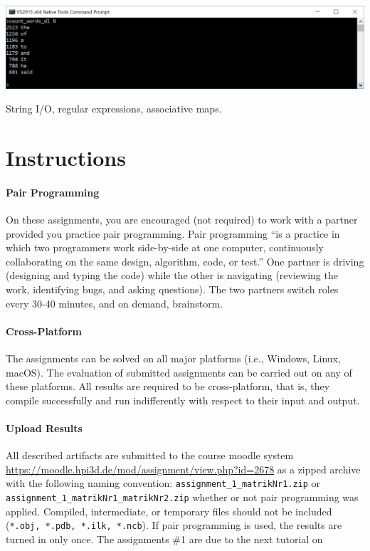 \documentclass{cgsblatt}
\let\theexercise 1
\begin{document}
\hspace{\leftmargin}\includegraphics[width=\linewidth-\leftmargin]{count_words}


String I/O, regular expressions, associative maps. 


\pagebreak
\section*{Instructions}

\paragraph{Pair Programming}
On these assignments, 
you are encouraged (not required) to work with a partner 
provided you practice pair programming. 
Pair programming \enquote{is a practice in which two programmers work side-by-side at one computer, continuously collaborating on the same design, algorithm, code, or test.}
One partner is driving (designing and typing the code) 
while the other is navigating (reviewing the work, identifying bugs, and asking questions). 
The two partners switch roles every 30-40 minutes, and on demand, brainstorm.

\paragraph{Cross-Platform}
The assignments can be solved on all major platforms (i.e., Windows, Linux, macOS).
The evaluation of submitted assignments can be carried out on any of these platforms. 
All results are required to be cross-platform, that is, they compile successfully and run indifferently with respect to their input and output.

\paragraph{Upload Results}
All described artifacts are submitted to the course moodle system \url{https://moodle.hpi3d.de/mod/assignment/view.php?id=2678} as a zipped archive with the 
following naming convention: \verb|assignment_1_matrikNr1.zip| or \verb|assignment_1_matrikNr1_matrikNr2.zip| whether or not pair programming was applied. 
Compiled, intermediate, or temporary files should not be included (\lstinline|*.obj, *.pdb, *.ilk, *.ncb|).
If pair programming is used, the results are turned in only once. 
The assignments \#\theexercise{} are due to the next tutorial on 
\end{document}
